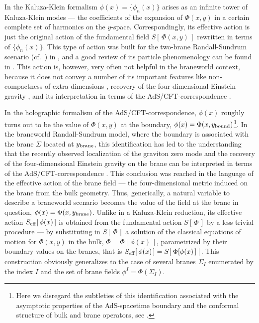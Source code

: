 \documentclass[a4paper,preprint,nofootinbib,
                 showpacs,preprintnumbers,amsmath,amssymb]{revtex4}
\begin{document}
In the Kaluza-Klein formalism $\phi(x)=\{\phi_n(x)\}$ arises as an  
infinite 
tower of Kaluza-Klein modes --- the coefficients of the expansion of 
$\Phi(x,y)$ in a certain complete set of harmonics on the $y$-space. 
Correspondingly, its effective action is just the original action of the 
fundamental field $S[\,\Phi(x,y)\,]$ rewritten in terms of $\{\phi_n(x)\}$. 
This type of action was built for the two-brane Randall-Sundrum scenario 
(cf.~\cite{RS}) in \cite{KubVol}, and a good review of its particle 
phenomenology can be found in \cite{Kub}.  This  action is, however,  
very often not 
helpful in the braneworld context, because it does not convey a 
number of its important features like non-compactness of extra 
dimensions \cite{RSloc,Rub}, recovery of the four-dimensional 
Einstein gravity \cite{GT}, and its interpretation in terms of the 
AdS/CFT-correspondence \cite{Gubser,GKR,HHR1}. 
 
In the holographic formalism of the AdS/CFT-correspondence, $\phi(x)$  
roughly turns out to be the value of $\Phi(x,y)$ at the boundary,  
$\phi(x)=\Phi(x,y_{\rm bound})$\footnote{Here we disregard the  
subtleties of this identification associated with the asymptotic  
properties of the AdS-spacetime boundary and the conformal structure  
of bulk and brane operators, see \cite{BalGiLa,BalKraLa}.}. In the  
braneworld Randall-Sundrum model, where 
the boundary is associated with the brane $\Sigma$ located at $y_{\rm brane}$, 
this identification has led to the understanding that the recently observed 
localization of the graviton zero mode \cite{RSloc} and the recovery of the 
four-dimensional Einstein gravity on the brane \cite{RSloc,GT,ChGR} can be 
interpreted in terms of the AdS/CFT-correspondence \cite{Gubser,GKR,HHR1}. 
This conclusion was reached in the language of the effective action of the 
brane field --- the four-dimensional metric induced on the brane from the bulk 
geometry. Thus, generically, a natural variable to describe a braneworld 
scenario becomes the value of the field at the brane in question, 
$\phi(x)=\Phi(x,y_{\rm brane})$. Unlike in a Kaluza-Klein reduction, its 
effective action $S_{\rm eff}[\,\phi(x)\,]$ is obtained from the fundamental 
action $S[\,\Phi\,]$ by a less trivial procedure --- by substituting in 
$S[\,\Phi\,]$ a solution of the classical equations of motion for $\Phi(x,y)$ 
in the bulk, $\Phi=\Phi[\,\phi(x)\,]$, parametrized by their boundary values 
on the branes, that is $S_{\rm eff}[\,\phi(x)\,] 
=S\big[\,\Phi[\phi(x)\,]\,\big]$. This construction obviously generalizes to 
the case of several branes $\Sigma_I$ enumerated by the index $I$ and the set 
of brane fields $\phi^I=\Phi(\Sigma_I)$. 
 
\end{document}

